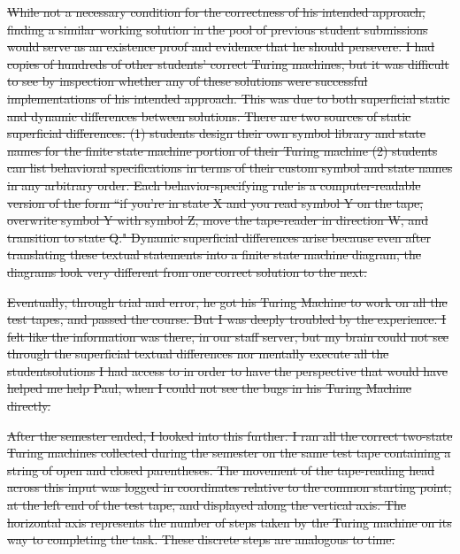 \documentclass[12pt,twoside]{mitthesis}
\providecommand{\DIFdeltex}[1]{{\protect\color{red}\sout{#1}}}                      %
\providecommand{\DIFdelbegin}{} %
\providecommand{\DIFdel}[1]{\texorpdfstring{\DIFdeltex{#1}}{}} %
\begin{document}
\DIFdelbegin \DIFdel{While not a necessary condition for the correctness of his intended approach, finding a similar working solution in the pool of previous student submissions would serve as an existence proof and evidence that he should persevere.
I had copies of hundreds of other students' correct Turing machines, but it was difficult to see by inspection whether any of these solutions were successful implementations of his intended approach. This was due to both superficial static and dynamic differences between solutions. There are two sources of static superficial differences: (1) students design their own symbol library and state names for the finite state machine portion of their Turing machine (2) students can list behavioral specifications in terms of their custom symbol and state names in any arbitrary order. Each behavior-specifying rule is a computer-readable version of the form ``if you're in state X and you read symbol Y on the tape, overwrite symbol Y with symbol Z, move the tape-reader in direction W, and transition to state Q." Dynamic superficial differences arise because even after translating these textual statements into a finite state machine diagram, the diagrams look very different from one correct solution to the next.
}%

\DIFdel{Eventually, through trial and error, he got his Turing Machine to work on all the test tapes, and passed the course. But I was deeply troubled by the experience. I felt like the information was there, in our staff server, but my brain could not see through the superficial textual differences nor mentally execute all the studentsolutions I had access to in order to have the perspective that would have helped me help Paul, when I could not see the bugs in his Turing Machine directly. }%

\DIFdel{After the semester ended, I looked into this further. I ran all the correct two-state Turing machines collected during the semester on the same test tape containing a string of open and closed parentheses. The movement of the tape-reading head across this input was logged in coordinates relative to the common starting point, at the left end of the test tape, and displayed along the vertical axis. The horizontal axis represents the number of steps taken by the Turing machine on its way to completing the task. These discrete steps are analogous to time. 
}%
\end{document}
